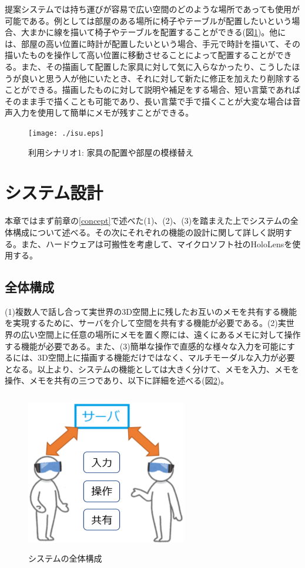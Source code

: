 \documentclass[11pt,a4j, titlepage]{jarticle} %
\begin{document}
提案システムでは持ち運びが容易で広い空間のどのような場所であっても使用が可能である。例としては部屋のある場所に椅子やテーブルが配置したいという場合、大まかに線を描いて椅子やテーブルを配置することができる(図\ref{fig:isu})。他には、部屋の高い位置に時計が配置したいという場合、手元で時計を描いて、その描いたものを操作して高い位置に移動させることによって配置することができる。また、その描画して配置した家具に対して気に入らなかったり、こうしたほうが良いと思う人が他にいたとき、それに対して新たに修正を加えたり削除することができる。描画したものに対して説明や補足をする場合、短い言葉であればそのまま手で描くことも可能であり、長い言葉で手で描くことが大変な場合は音声入力を使用して簡単にメモが残すことができる。

\begin{figure}[H]
  \begin{center}
    \texttt{[image: ./isu.eps]}
    \caption{利用シナリオ1: 家具の配置や部屋の模様替え}
    \label{fig:isu}
  \end{center}
\end{figure}

\newpage
\section{システム設計}
本章ではまず前章の\ref{concept}で述べた(1)、(2)、(3)を踏まえた上でシステムの全体構成について述べる。その次にそれぞれの機能の設計に関して詳しく説明する。また、ハードウェアは可搬性を考慮して、マイクロソフト社のHoloLens\cite{hololens}を使用する。

\subsection{全体構成}
(1)複数人で話し合って実世界の3D空間上に残したお互いのメモを共有する機能を実現するために、サーバを介して空間を共有する機能が必要である。(2)実世界の広い空間上に任意の場所にメモを置く際には、遠くにあるメモに対して操作する機能が必要である。また、(3)簡単な操作で直感的な様々な入力を可能にするには、3D空間上に描画する機能だけではなく、マルチモーダルな入力が必要となる。以上より、システムの機能としては大きく分けて、メモを入力、メモを操作、メモを共有の三つであり、以下に詳細を述べる(図\ref{fig:systemzentai})。

\begin{figure}[H]
  \begin{center}
    \includegraphics[clip,height=7.0cm,width=7.0cm]{./systemzentai.eps}
    \caption{システムの全体構成}
    \label{fig:systemzentai}
  \end{center}
\end{figure}
\end{document}
